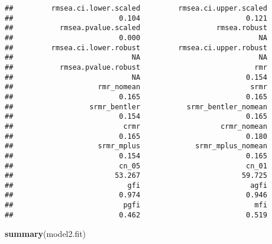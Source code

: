 \documentclass[
]{article}
\newenvironment{Shaded}{\begin{snugshade}}{\end{snugshade}}
\newcommand{\KeywordTok}[1]{\textcolor[rgb]{0.13,0.29,0.53}{\textbf{#1}}}
\newcommand{\NormalTok}[1]{#1}
\begin{document}
\begin{verbatim}
##         rmsea.ci.lower.scaled         rmsea.ci.upper.scaled 
##                         0.104                         0.121 
##           rmsea.pvalue.scaled                  rmsea.robust 
##                         0.000                            NA 
##         rmsea.ci.lower.robust         rmsea.ci.upper.robust 
##                            NA                            NA 
##           rmsea.pvalue.robust                           rmr 
##                            NA                         0.154 
##                    rmr_nomean                          srmr 
##                         0.165                         0.165 
##                  srmr_bentler           srmr_bentler_nomean 
##                         0.154                         0.165 
##                          crmr                   crmr_nomean 
##                         0.165                         0.180 
##                    srmr_mplus             srmr_mplus_nomean 
##                         0.154                         0.165 
##                         cn_05                         cn_01 
##                        53.267                        59.725 
##                           gfi                          agfi 
##                         0.974                         0.946 
##                          pgfi                           mfi 
##                         0.462                         0.519
\end{verbatim}

\begin{Shaded}
\begin{Highlighting}[]
\KeywordTok{summary}\NormalTok{(model2.fit)}
\end{Highlighting}
\end{Shaded}
\end{document}
